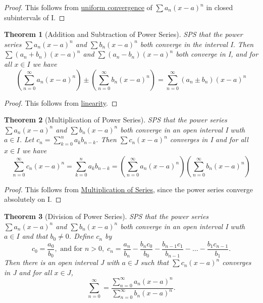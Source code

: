 \documentclass[11pt, oneside]{book}
\theoremstyle{break}
\newtheorem{thm}{Theorem}[section]
\newtheorem*{proof}{Proof}
\begin{document}
\begin{proof}
	This follows from \hyperref[unif_conv_series_fn]{uniform convergence} of $\sum a_n (x - a)^n$ in closed subintervals of I.
\end{proof}

\begin{thm}[Addition and Subtraction of Power Series]
	SPS that the power series $\sum a_n (x-a)^n$ and $\sum b_n (x-a)^n$ both converge in the interval I. Then $\sum (a_n + b_n)(x-a)^n$ and $\sum (a_n - b_n)(x-a)^n$ both converge in I, and for all $x \in I$ we have
	\[
		\left( \sum_{n=0}^{\infty} a_n (x-a)^n \right) \pm \left( \sum_{n=0}^{\infty} b_n (x-a)^n \right) = \sum_{n=0}^{\infty} (a_n \pm b_n)(x-a)^n
	\]
\end{thm}

\begin{proof}
	This follows from \hyperref[series_linearity]{linearity}.
\end{proof}

\begin{thm}[Multiplication of Power Series]
	SPS that the power series $\sum a_n (x-a)^n$ and $\sum b_n (x-a)^n$ both converge in an open interval I wuth $a \in I$. Let $c_n = \sum\limits_{k=0}^{n} a_k b_{n-k}$. Then $\sum c_n (x-a)^n$ converges in I and for all $x \in I$ we have
	\[
		\sum_{n=0}^{\infty} c_n (x-a)^n = \sum\limits_{k=0}^{n} a_k b_{n-k} = \left( \sum_{n=0}^{\infty} a_n (x-a)^n \right) \left( \sum_{n=0}^{\infty} b_n (x-a)^n \right)
	\]
\end{thm}

\begin{proof}
	This follows from \hyperref[series_multiplication]{Multiplication of Series}, since the power series converge absolutely on I.
\end{proof}

\begin{thm}[Division of Power Series]
	SPS that the power series $\sum a_n (x-a)^n$ and $\sum b_n (x-a)^n$ both converge in an open interval I wuth $a \in I$ and that $b_0 \neq 0$. Define $c_n$ by
	\[
		c_0 = \frac{a_0}{b_0}, \text{ and for } n > 0, \; c_n = \frac{a_n}{b_n} - \frac{b_n c_0}{b_0} - \frac{b_{n-1} c_1}{b_{n-1}} - \hdots - \frac{b_1 c_{n-1}}{b_1}. 
	\]
	Then there is an open interval J with $a \in J$ such that $\sum c_n (x-a)^n$ converges in J and for all $x \in J$,
	\[
		\sum_{n = 0}^{\infty} = \frac{ \sum\limits_{n=0}^{\infty} a_n (x-a)^n }{ \sum\limits_{n=0}^{\infty} b_n (x-a)^n }.
	\]
\end{thm}
\end{document}
